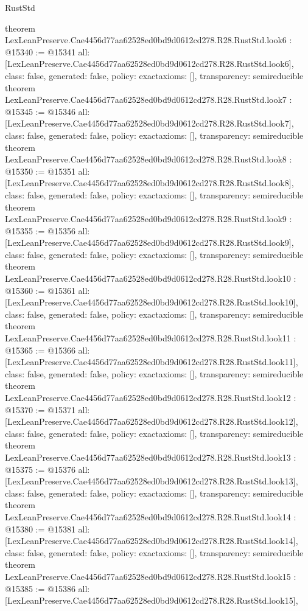 \begin{lexlean}{RustStd}
\begin{coremodule}
{}
theorem LexLeanPreserve.Cae4456d77aa62528ed0bd9d0612cd278.R28.RustStd.look6 : @15340 := @15341 {
  all: [LexLeanPreserve.Cae4456d77aa62528ed0bd9d0612cd278.R28.RustStd.look6],
  class: false,
  generated: false,
  policy: exact{axioms: []},
  transparency: semireducible
}
theorem LexLeanPreserve.Cae4456d77aa62528ed0bd9d0612cd278.R28.RustStd.look7 : @15345 := @15346 {
  all: [LexLeanPreserve.Cae4456d77aa62528ed0bd9d0612cd278.R28.RustStd.look7],
  class: false,
  generated: false,
  policy: exact{axioms: []},
  transparency: semireducible
}
theorem LexLeanPreserve.Cae4456d77aa62528ed0bd9d0612cd278.R28.RustStd.look8 : @15350 := @15351 {
  all: [LexLeanPreserve.Cae4456d77aa62528ed0bd9d0612cd278.R28.RustStd.look8],
  class: false,
  generated: false,
  policy: exact{axioms: []},
  transparency: semireducible
}
theorem LexLeanPreserve.Cae4456d77aa62528ed0bd9d0612cd278.R28.RustStd.look9 : @15355 := @15356 {
  all: [LexLeanPreserve.Cae4456d77aa62528ed0bd9d0612cd278.R28.RustStd.look9],
  class: false,
  generated: false,
  policy: exact{axioms: []},
  transparency: semireducible
}
theorem LexLeanPreserve.Cae4456d77aa62528ed0bd9d0612cd278.R28.RustStd.look10 : @15360 := @15361 {
  all: [LexLeanPreserve.Cae4456d77aa62528ed0bd9d0612cd278.R28.RustStd.look10],
  class: false,
  generated: false,
  policy: exact{axioms: []},
  transparency: semireducible
}
theorem LexLeanPreserve.Cae4456d77aa62528ed0bd9d0612cd278.R28.RustStd.look11 : @15365 := @15366 {
  all: [LexLeanPreserve.Cae4456d77aa62528ed0bd9d0612cd278.R28.RustStd.look11],
  class: false,
  generated: false,
  policy: exact{axioms: []},
  transparency: semireducible
}
theorem LexLeanPreserve.Cae4456d77aa62528ed0bd9d0612cd278.R28.RustStd.look12 : @15370 := @15371 {
  all: [LexLeanPreserve.Cae4456d77aa62528ed0bd9d0612cd278.R28.RustStd.look12],
  class: false,
  generated: false,
  policy: exact{axioms: []},
  transparency: semireducible
}
theorem LexLeanPreserve.Cae4456d77aa62528ed0bd9d0612cd278.R28.RustStd.look13 : @15375 := @15376 {
  all: [LexLeanPreserve.Cae4456d77aa62528ed0bd9d0612cd278.R28.RustStd.look13],
  class: false,
  generated: false,
  policy: exact{axioms: []},
  transparency: semireducible
}
theorem LexLeanPreserve.Cae4456d77aa62528ed0bd9d0612cd278.R28.RustStd.look14 : @15380 := @15381 {
  all: [LexLeanPreserve.Cae4456d77aa62528ed0bd9d0612cd278.R28.RustStd.look14],
  class: false,
  generated: false,
  policy: exact{axioms: []},
  transparency: semireducible
}
theorem LexLeanPreserve.Cae4456d77aa62528ed0bd9d0612cd278.R28.RustStd.look15 : @15385 := @15386 {
  all: [LexLeanPreserve.Cae4456d77aa62528ed0bd9d0612cd278.R28.RustStd.look15],
}
\end{coremodule}
\end{lexlean}
